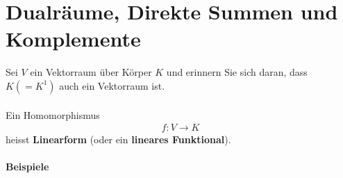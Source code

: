 \documentclass[11pt]{report}
\newcommand*\f[1] {\textbf{#1}}
\begin{document}
\section{Dualräume, Direkte Summen und Komplemente}
Sei $V$ ein Vektorraum über Körper $K$ und erinnern Sie sich daran, dass $K(=K^1)$ auch ein Vektorraum ist.\\\\
Ein Homomorphismus
\begin{align}
 f: V \rightarrow K
\end{align}
heisst \f{Linearform} (oder ein \f{lineares Funktional}).

\paragraph{Beispiele}
\end{document}
